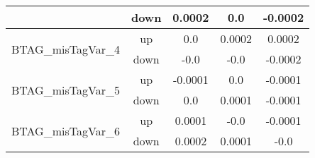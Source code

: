 \begin{table}[h!]
\begin{tabular}{lcccc}
                                       & down &     0.0002     &     0.0     &     -0.0002       \\ \hline
\multirow{2}{*}{BTAG\_misTagVar\_4}      & up   &     0.0     &     0.0002     &     0.0002      \\
                                       & down &     -0.0     &     -0.0     &     -0.0002       \\ \hline
\multirow{2}{*}{BTAG\_misTagVar\_5}      & up   &     -0.0001     &     0.0     &     -0.0001      \\
                                       & down &     0.0     &     0.0001     &     -0.0001       \\ \hline
\multirow{2}{*}{BTAG\_misTagVar\_6}      & up   &     0.0001     &     -0.0     &     -0.0001      \\
                                       & down &     0.0002     &     0.0001     &     -0.0       \\ \hline


\end{tabular}
\end{table}


